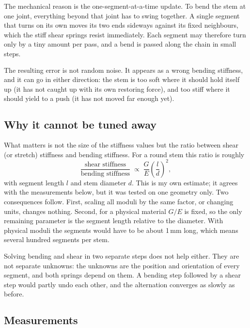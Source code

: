 The mechanical reason is the one-segment-at-a-time update. To bend the stem at one joint, everything beyond
that joint has to swing together. A single segment that turns on its own moves its two ends sideways
against its fixed neighbours, which the stiff shear springs resist immediately. Each segment may therefore
turn only by a tiny amount per pass, and a bend is passed along the chain in small steps.

The resulting error is not random noise. It appears as a wrong bending stiffness, and it can go in either
direction: the stem is too soft where it should hold itself up (it has not caught up with its own restoring
force), and too stiff where it should yield to a push (it has not moved far enough yet).

\subsection{Why it cannot be tuned away}

What matters is not the size of the stiffness values but the ratio between shear (or stretch) stiffness
and bending stiffness. For a round stem this ratio is roughly
\begin{equation*}
  \frac{\text{shear stiffness}}{\text{bending stiffness}} \;\propto\;
  \frac{G}{E}\left(\frac{l}{d}\right)^{2},
\end{equation*}
with segment length $l$ and stem diameter $d$. This is my own estimate; it agrees with the measurements
below, but it was tested on one geometry only. Two consequences follow. First, scaling all moduli by the
same factor, or changing units, changes nothing. Second, for a physical material $G/E$ is fixed, so the
only remaining parameter is the segment length relative to the diameter. With physical moduli the segments
would have to be about 1\,mm long, which means several hundred segments per stem.

Solving bending and shear in two separate steps does not help either. They are not separate unknowns: the
unknowns are the position and orientation of every segment, and both springs depend on them. A bending
step followed by a shear step would partly undo each other, and the alternation converges as slowly as
before.

\subsection{Measurements}

